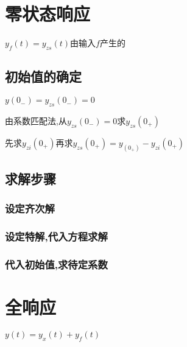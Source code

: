 \documentclass{article}
\begin{document}
    \section{零状态响应}%
    $y_{f}(t)=y_{zs}(t)$由输入$f$产生的

    \subsection{初始值的确定}%

    $y(0_-)=y_{zs}(0_-)=0$

    由系数匹配法,从$y_{zs}(0_-)=0$求$y_{zs}(0_+)$

    先求$y_{zi}(0_+)$再求$y_{zs}(0_+)=y_(0_+)-y_{zi}(0_+)$

    \subsection{求解步骤}%
        \subsubsection{设定齐次解}%
        \subsubsection{设定特解,代入方程求解}%
        \subsubsection{代入初始值,求待定系数}%

    \section{全响应}%

    $y(t)=y_x(t)+y_f(t)$
    
\end{document}

